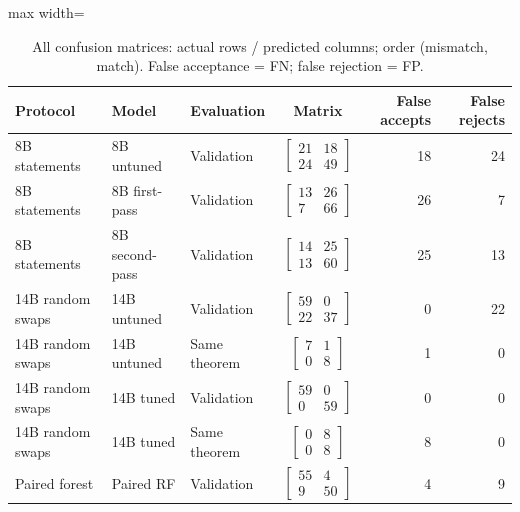 \begin{table}[htbp]
\centering
\caption{All confusion matrices: actual rows / predicted columns; order (mismatch, match). False acceptance = FN; false rejection = FP.}
\label{tab:main-confusion}
\small
\begin{adjustbox}{max width=\textwidth}
\begin{tabular}{lllcrr}
\toprule
Protocol & Model & Evaluation & Matrix & False accepts & False rejects \\
\midrule
8B statements & 8B untuned & Validation & $\left[\begin{smallmatrix}21&18\\24&49\end{smallmatrix}\right]$ & 18 & 24 \\
8B statements & 8B first-pass & Validation & $\left[\begin{smallmatrix}13&26\\7&66\end{smallmatrix}\right]$ & 26 & 7 \\
8B statements & 8B second-pass & Validation & $\left[\begin{smallmatrix}14&25\\13&60\end{smallmatrix}\right]$ & 25 & 13 \\
14B random swaps & 14B untuned & Validation & $\left[\begin{smallmatrix}59&0\\22&37\end{smallmatrix}\right]$ & 0 & 22 \\
14B random swaps & 14B untuned & Same theorem & $\left[\begin{smallmatrix}7&1\\0&8\end{smallmatrix}\right]$ & 1 & 0 \\
14B random swaps & 14B tuned & Validation & $\left[\begin{smallmatrix}59&0\\0&59\end{smallmatrix}\right]$ & 0 & 0 \\
14B random swaps & 14B tuned & Same theorem & $\left[\begin{smallmatrix}0&8\\0&8\end{smallmatrix}\right]$ & 8 & 0 \\
Paired forest & Paired RF & Validation & $\left[\begin{smallmatrix}55&4\\9&50\end{smallmatrix}\right]$ & 4 & 9 \\

\end{tabular}
\end{adjustbox}
\end{table}
